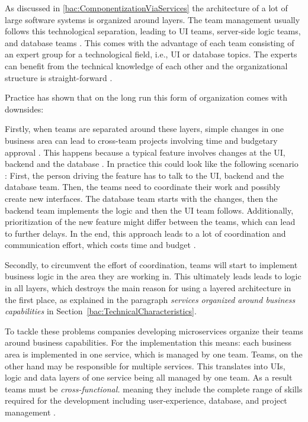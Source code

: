 As discussed in \ref{bac:ComponentizationViaServices} the architecture of a lot of large software systems is organized around layers.
The team management usually follows this technological separation, leading to \ac{UI} teams, server-side logic teams, and database teams \cite{FowlerFowlerBusinessCap2014}.
This comes with the advantage of each team consisting of an expert group for a technological field, i.e., \ac{UI} or database topics.
The experts can benefit from the technical knowledge of each other and the organizational structure is straight-forward \citep[p. 40]{Wolff2016}.

Practice has shown that on the long run this form of organization comes with downsides:

Firstly, when teams are separated around these layers, simple changes in one business area can lead to cross-team projects involving time and budgetary approval \cite{FowlerFowlerBusinessCap2014}.
This happens because a typical feature involves changes at the \ac{UI}, backend and the database \citep[p. 40]{Wolff2016}.
In practice this could look like the following scenario \citep[p. 40]{Wolff2016}:
First, the person driving the feature has to talk to the UI, backend and the database team.
Then, the teams need to coordinate their work and possibly create new interfaces.
The database team starts with the changes, then the backend team implements the logic and then the \ac{UI} team follows.
Additionally, prioritization of the new feature might differ between the teams, which can lead to further delays.
In the end, this approach leads to a lot of coordination and communication effort, which costs time and budget \citep[p. 41]{Wolff2016}.

Secondly, to circumvent the effort of coordination, teams will start to implement business logic in the area they are working in.
This ultimately leads leads to logic in all layers, which destroys the main reason for using a layered architecture in the first place, as explained in the paragraph \textit{services organized around business capabilities} in Section~\ref{bac:TechnicalCharacteristics}.

To tackle these problems companies developing microservices organize their teams around business capabilities.
For the implementation this means: each business area is implemented in one service, which is managed by one team.
Teams, on the other hand may be responsible for multiple services.
This translates into \acs{UI}s, logic and data layers of one service being all managed by one team. 
As a result teams must be \textit{cross-functional.} meaning they include the complete range of skills required for the development including user-experience, database, and project management \citep{Fowler2014}. 


